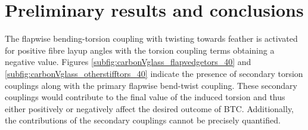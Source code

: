 \documentclass[a4paper]{jpconf}
\begin{document}
\section{Preliminary results and conclusions}
\label{sec:results}
The flapwise bending-torsion coupling with twisting towards feather is activated for positive fibre layup angles with the torsion coupling terms obtaining a negative value. Figures \ref{subfig:carbonVglass_flapvedgetors_40} and \ref{subfig:carbonVglass_otherstifftors_40} indicate the presence of secondary torsion couplings along with the primary flapwise bend-twist coupling. These secondary couplings would contribute to the final value of the induced torsion and thus either positively or negatively affect the desired outcome of BTC. Additionally, the contributions of the secondary couplings cannot be precisely quantified.      
\end{document}
